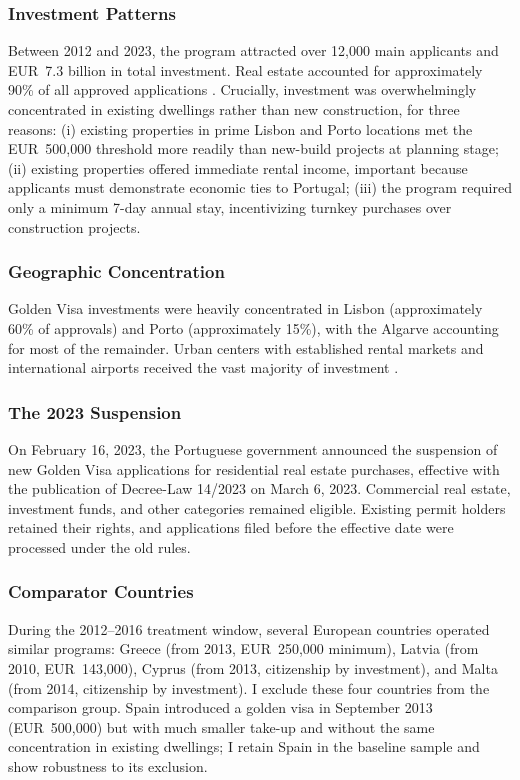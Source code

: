 \documentclass[12pt]{article}
\begin{document}
\subsubsection*{Investment Patterns} Between 2012 and 2023, the program attracted over 12,000 main applicants and EUR~7.3 billion in total investment. Real estate accounted for approximately 90\% of all approved applications \citep{SEF2023}. Crucially, investment was overwhelmingly concentrated in existing dwellings rather than new construction, for three reasons: (i) existing properties in prime Lisbon and Porto locations met the EUR~500,000 threshold more readily than new-build projects at planning stage; (ii) existing properties offered immediate rental income, important because applicants must demonstrate economic ties to Portugal; (iii) the program required only a minimum 7-day annual stay, incentivizing turnkey purchases over construction projects.

\subsubsection*{Geographic Concentration} Golden Visa investments were heavily concentrated in Lisbon (approximately 60\% of approvals) and Porto (approximately 15\%), with the Algarve accounting for most of the remainder. Urban centers with established rental markets and international airports received the vast majority of investment \citep{SaFurtado2021}.

\subsubsection*{The 2023 Suspension} On February 16, 2023, the Portuguese government announced the suspension of new Golden Visa applications for residential real estate purchases, effective with the publication of Decree-Law 14/2023 on March 6, 2023. Commercial real estate, investment funds, and other categories remained eligible. Existing permit holders retained their rights, and applications filed before the effective date were processed under the old rules.

\subsubsection*{Comparator Countries} During the 2012--2016 treatment window, several European countries operated similar programs: Greece (from 2013, EUR~250,000 minimum), Latvia (from 2010, EUR~143,000), Cyprus (from 2013, citizenship by investment), and Malta (from 2014, citizenship by investment). I exclude these four countries from the comparison group. Spain introduced a golden visa in September 2013 (EUR~500,000) but with much smaller take-up and without the same concentration in existing dwellings; I retain Spain in the baseline sample and show robustness to its exclusion.
\end{document}
